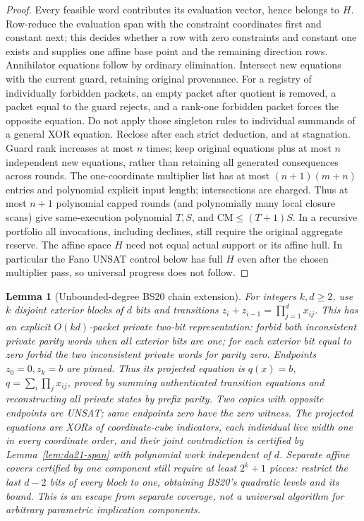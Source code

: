 \documentclass[11pt]{article}
\newtheorem{lemma}[theorem]{Lemma}
\begin{document}
\begin{proof}
Every feasible word contributes its evaluation vector, hence belongs to $H$. Row-reduce the evaluation span with the constraint coordinates first and constant next; this decides whether a row with zero constraints and constant one exists and supplies one affine base point and the remaining direction rows. Annihilator equations follow by ordinary elimination. Intersect new equations with the current guard, retaining original provenance. For a registry of individually forbidden packets, an empty packet after quotient is removed, a packet equal to the guard rejects, and a rank-one forbidden packet forces the opposite equation. Do not apply those singleton rules to individual summands of a general XOR equation. Reclose after each strict deduction, and at stagnation. Guard rank increases at most $n$ times; keep original equations plus at most $n$ independent new equations, rather than retaining all generated consequences across rounds. The one-coordinate multiplier list has at most $(n+1)(m+n)$ entries and polynomial explicit input length; intersections are charged. Thus at most $n+1$ polynomial capped rounds (and polynomially many local closure scans) give same-execution polynomial $T,S$, and $\mathrm{CM}\le(T+1)S$. In a recursive portfolio all invocations, including declines, still require the original aggregate reserve. The affine space $H$ need not equal actual support or its affine hull. In particular the Fano UNSAT control below has full $H$ even after the chosen multiplier pass, so universal progress does not follow.
\end{proof}
\begin{lemma}[Unbounded-degree BS20 chain extension]\label{lem:da21-chain}
For integers $k,d\ge2$, use $k$ disjoint exterior blocks of $d$ bits and transitions $z_i+z_{i-1}=\prod_{j=1}^d x_{ij}$. This has an explicit $O(kd)$-packet private two-bit representation: forbid both inconsistent private parity words when all exterior bits are one; for each exterior bit equal to zero forbid the two inconsistent private words for parity zero. Endpoints $z_0=0,z_k=b$ are pinned. Thus its projected equation is $q(x)=b$, $q=\sum_i\prod_j x_{ij}$, proved by summing authenticated transition equations and reconstructing all private states by prefix parity. Two copies with opposite endpoints are UNSAT; same endpoints zero have the zero witness. The projected equations are XORs of coordinate-cube indicators, each individual live width one in every coordinate order, and their joint contradiction is certified by Lemma~\ref{lem:da21-span} with polynomial work independent of $d$. Separate affine covers certified by one component still require at least $2^k+1$ pieces: restrict the last $d-2$ bits of every block to one, obtaining BS20's quadratic levels and its bound. This is an escape from separate coverage, not a universal algorithm for arbitrary parametric implication components.
\end{lemma}
\end{document}
